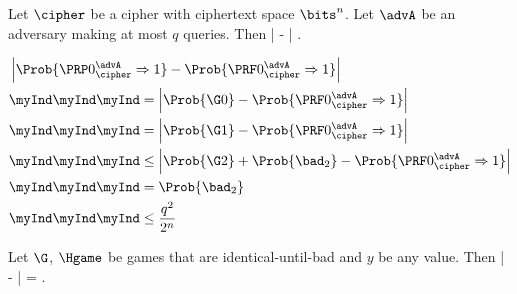 \begin{lemma} Let $\cipher$ be a cipher with ciphertext space $\bits^n$. 
Let $\advA$ be an adversary making at most $q$ queries. Then
\bnm
  \left|  
      -  \right| \le {}  \;.
\enm
\end{lemma}

\begin{align*}
&\left| \Prob{\PRP0_\cipher^\advA\Rightarrow 1} 
      - \Prob{\PRF0_\cipher^\advA\Rightarrow1} \right| \\ 
     &\myInd\myInd\myInd =  \left|\Prob{\G0} - \Prob{\PRF0_\cipher^\advA\Rightarrow1} \right|  \\
     &\myInd\myInd\myInd  =  \left|\Prob{\G1} - \Prob{\PRF0_\cipher^\advA\Rightarrow1} \right|  \\
     &\myInd\myInd\myInd  \le \left|\Prob{\G2} + \Prob{\bad_2} - \Prob{\PRF0_\cipher^\advA\Rightarrow1} \right|\\
     &\myInd\myInd\myInd  = \Prob{\bad_2}\\
     &\myInd\myInd\myInd  \le \frac{q^2}{2^n}\\
\end{align*}

\begin{lemma} Let $\G$, $\Hgame$ be games that are identical-until-bad and $y$ be any
value. Then
\bnm
  \big|  
      -  \big| \le \Prob{\Hgame\setsbad} = \Prob{\G\setsbad}  \;.
\enm
\end{lemma}


\begin{figure}


\end{figure}



